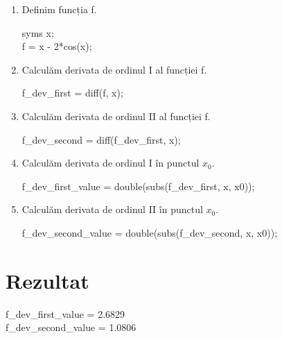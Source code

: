 \documentclass{article}
\begin{document}
\begin{center}
\begin{enumerate}
\item  Definim funcția f. \\
\begin{center}
    syms x;\\
    f = x - 2*cos(x);
\end{center}
\item Calculăm derivata de ordinul I al funcției f. \\
 \begin{center}
    f\_dev\_first = diff(f, x);
 \end{center}
\item Calculăm derivata de ordinul II al funcției f. \\
 \begin{center}
    f\_dev\_second = diff(f\_dev\_first, x);
 \end{center}
 \item Calculăm derivata de ordinul I în punctul $x_0$.\\
 \begin{center}
    f\_dev\_first\_value = double(subs(f\_dev\_first, x, x0));
 \end{center}
  \item Calculăm derivata de ordinul II în punctul $x_0$. \\
 \begin{center}
    f\_dev\_second\_value = double(subs(f\_dev\_second, x, x0));
 \end{center}
\end{enumerate}
\end{center}

\section*{Rezultat}
\begin{center}
f\_dev\_first\_value = 2.6829 \\ f\_dev\_second\_value = 1.0806
\end{center}
\end{document}
